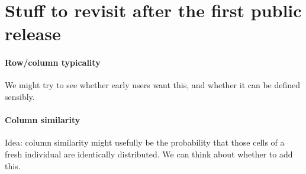 \documentclass[10pt,letterpaper]{article}
\begin{document}
\appendix
\section{Stuff to revisit after the first public release}

\paragraph{Row/column typicality}
We might try to see whether early users want this, and whether it can
be defined sensibly.

\paragraph{Column similarity}
Idea: column similarity might usefully be the probability that those
cells of a fresh individual are identically distributed.  We can think
about whether to add this.
\end{document}
